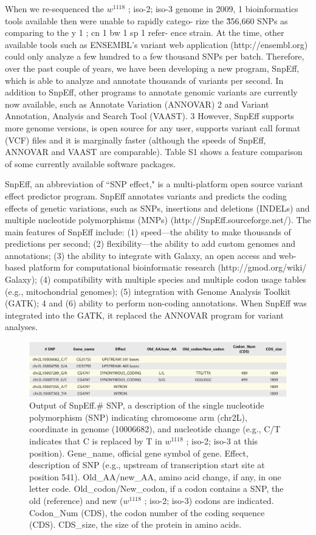 When we re-sequenced the $w^{1118}$ ; iso-2; iso-3 genome in 2009, 1 bioinformatics tools available then were unable to rapidly catego- rize the \~356,660 SNPs as comparing to the y 1 ; cn 1 bw 1 sp 1 refer- ence strain. At the time, other available tools such as ENSEMBL’s variant web application (http://ensembl.org) could only analyze a few hundred to a few thousand SNPs per batch. Therefore, over the past couple of years, we have been developing a new program, SnpEff, which is able to analyze and annotate thousands of variants per second. In addition to SnpEff, other programs to annotate genomic variants are currently now available, such as Annotate Variation (ANNOVAR) 2 and Variant Annotation, Analysis and Search Tool (VAAST). 3 However, SnpEff supports more genome versions, is open source for any user, supports variant call format (VCF) files and it is marginally faster (although the speeds of SnpEff, ANNOVAR and VAAST are comparable). Table S1 shows a feature comparison of some currently available software packages.

SnpEff, an abbreviation of ``SNP effect," is a multi-platform open source variant effect predictor program. SnpEff annotates variants and predicts the coding effects of genetic variations, such as SNPs, insertions and deletions (INDELs) and multiple nucleotide polymorphisms (MNPs) (http://SnpEff.sourceforge.net/).  The main features of SnpEff include: (1) speed—the ability to make thousands of predictions per second; (2) flexibility—the ability to add custom genomes and annotations; (3) the ability to integrate with Galaxy, an open access and web-based platform for computational bioinformatic research (http://gmod.org/wiki/ Galaxy); (4) compatibility with multiple species and multiple codon usage tables (e.g., mitochondrial genomes); (5) integration with Genome Analysis Toolkit (GATK); 4 and (6) ability to perform non-coding annotations. When SnpEff was integrated into the GATK, it replaced the ANNOVAR program for variant analyses.

\begin{figure}
    \centering
    \includegraphics[width=14cm]{snpeff_table1.png}
    \caption{Output of SnpEff.\# SNP, a description of the single nucleotide polymorphism (SNP) indicating chromosome arm (chr2L), coordinate in genome (10006682), and nucleotide change (e.g., C/T indicates that C is replaced by T in $w^{1118}$ ; iso-2; iso-3 at this position). Gene\_name, official gene symbol of gene. Effect, description of SNP (e.g., upstream of transcription start site at position 541). Old\_AA/new\_AA, amino acid change, if any, in one letter code. Old\_codon/New\_codon, if a codon contains a SNP, the old (reference) and new ($w^{1118}$ ; iso-2; iso-3) codons are indicated. Codon\_Num (CDS), the codon number of the coding sequence (CDS). CDS\_size, the size of the protein in amino acids.}
    \label{fig:snpeffTab1}
\end{figure}

